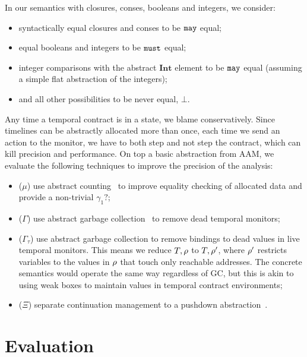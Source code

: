 %
In our semantics with closures, conses, booleans and integers, we consider:
\begin{itemize}
 \item syntactically equal closures and conses to be ${\tt may}$ equal;
 \item equal booleans and integers to be ${\tt must}$ equal;
 \item integer comparisons with the abstract $\mathbf{Int}$ element to be ${\tt may}$ equal (assuming a simple flat abstraction of the integers);
 \item and all other possibilities to be never equal, $\bot$.
\end{itemize}
%
Any time a temporal contract is in a \may{} state, we blame conservatively.
%
Since timelines can be abstractly allocated more than once, each time we send an action to the monitor, we have to both step and not step the contract, which can kill precision and performance.
%
On top a basic abstraction from AAM, we evaluate the following techniques to improve the precision of the analysis:
\begin{itemize}
\item{($\mu$) use abstract counting~\citep{dvanhorn:Might:2006:GammaCFA} to improve equality checking of allocated data and provide a non-trivial $\gamma_1?$;}
\item{($\Gamma$) use abstract garbage collection~\citep{dvanhorn:Might:2006:GammaCFA} to remove dead temporal monitors;}
\item{($\Gamma_\tau$) use abstract garbage collection to remove bindings to dead values in live temporal monitors.
%
This means we reduce $T,\rho$ to $T,\rho'$, where $\rho'$ restricts variables to the values in $\rho$ that touch only reachable addresses.
%
The concrete semantics would operate the same way regardless of GC, but this is akin to using weak boxes to maintain values in temporal contract environments;}
\item{($\Xi$) separate continuation management to a pushdown abstraction~\citep{dvanhorn:Vardoulakis2011CFA2}.}%
\end{itemize}

\section{Evaluation}\label{sec:evaluation}

